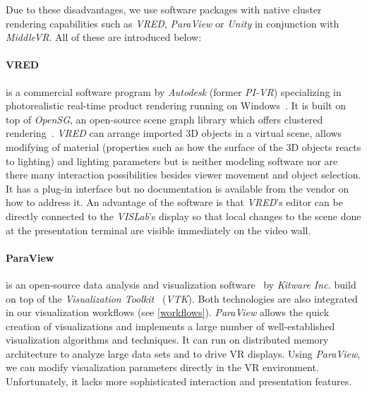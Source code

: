 \documentclass[twocolumn]{svjour3}          %
\begin{document}
Due to these disadvantages, we use software packages with native cluster rendering capabilities such as \emph{VRED}, \emph{ParaView} or \emph{Unity} in conjunction with \emph{MiddleVR}. All of these are introduced below:

\paragraph{VRED}
is a commercial software program by \emph{Autodesk} (former \emph{PI-VR}) specializing in photorealistic real-time product rendering running on Windows~\cite{web:vred}. It is built on top of \emph{OpenSG}, an open-source scene graph library which offers clustered rendering~\cite{opensg}. \emph{VRED} can arrange imported 3D objects in a virtual scene, allows modifying of material (properties such as how the surface of the 3D objects reacts to lighting) and lighting parameters but is neither modeling software nor are there many interaction possibilities besides viewer movement and object selection. It has a plug-in interface but no documentation is available from the vendor on how to address it. An advantage of the software is that \emph{VRED}'s editor can be directly connected to the \emph{VISLab}'s display so that local changes to the scene done at the presentation terminal are visible immediately on the video wall.

\paragraph{ParaView}
is an open-source data analysis and visualization software~\cite{paraview} by \emph{Kitware Inc.} build on top of the \emph{Visualization Toolkit}~\cite{vtk} (\emph{VTK}). Both technologies are also integrated in our visualization workflows (see \ref{workflows}). \emph{ParaView} allows the quick creation of visualizations and implements a large number of well-established visualization algorithms and techniques. It can run on distributed memory architecture to analyze large data sets and to drive VR displays. Using \emph{ParaView}, we can modify visualization parameters directly in the VR environment. Unfortunately, it lacks more sophisticated interaction and presentation features.
\end{document}
